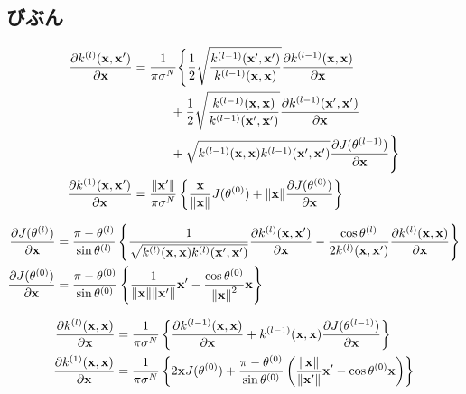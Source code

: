 \documentclass[11pt,a4j]{article}
\begin{document}
    \subsection{びぶん}
      \begin{align}
        \frac{\partial k^{(l)}({\bf x}, {\bf x}')}{\partial {\bf x}} 
        &= \frac{1}{\pi \sigma^N} \Biggl\{ \frac{1}{2} \sqrt{\frac{k^{(l-1)}({\bf x}', {\bf x}')}{k^{(l-1)}({\bf x}, {\bf x})}} \frac{\partial k^{(l-1)}({\bf x}, {\bf x}) }{\partial {\bf x}} \\
        &\hspace{3em}                   + \frac{1}{2} \sqrt{ \frac{k^{(l-1)}({\bf x}, {\bf x})}{k^{(l-1)}({\bf x}', {\bf x}')} } \frac{\partial k^{(l-1)}({\bf x}', {\bf x}') }{\partial {\bf x}} \\
        &\hspace{3em}                   + \sqrt{k^{(l-1)}({\bf x}, {\bf x}) k^{(l-1)}({\bf x}', {\bf x}')} \frac{\partial J(\theta^{(l-1)})}{\partial {\bf x}} \Biggr\} \\
        \frac{\partial k^{(1)}({\bf x}, {\bf x}')}{\partial {\bf x}} 
        &= \frac{\| {\bf x}' \|}{\pi \sigma^N} \left\{ \frac{\bf x}{\| {\bf x} \|} J(\theta^{(0)}) + \|{\bf x}\| \frac{\partial J(\theta^{(0)})}{\partial {\bf x}} \right\} \\
      \end{align}

      \begin{align}
        \frac{\partial J(\theta^{(l)})}{\partial {\bf x}} &= \frac{ \pi - \theta^{(l)}}{ \sin \theta^{(l)}} \left\{ \frac{1}{\sqrt{k^{(l)}({\bf x}, {\bf x}) k^{(l)}({\bf x}', {\bf x}') }} \frac{\partial k^{(l)}({\bf x}, {\bf x}')}{\partial {\bf x}} - \frac{\cos \theta^{(l)}}{2 k^{(l)}({\bf x}, {\bf x}')} \frac{\partial k^{(l)}({\bf x}, {\bf x})}{\partial {\bf x}} \right\} \\
        \frac{\partial J(\theta^{(0)})}{\partial {\bf x}} &= \frac{ \pi - \theta^{(0)}}{ \sin \theta^{(0)}} \left\{ \frac{1}{ \|{\bf x}\| \|{\bf x}'\| } {\bf x}' - \frac{ \cos \theta^{(0)}}{{\|{\bf x}\|}^2} {\bf x} \right\}
      \end{align}

      \begin{align}
        \frac{\partial k^{(l)}({\bf x}, {\bf x})}{\partial {\bf x}} 
        &= \frac{1}{\pi \sigma^N} \left\{ \frac{\partial k^{(l-1)}({\bf x}, {\bf x})}{\partial {\bf x}} + k^{(l-1)}({\bf x}, {\bf x}) \frac{\partial J(\theta^{(l-1)})}{\partial {\bf x}} \right\} \\
        \frac{\partial k^{(1)}({\bf x}, {\bf x})}{\partial {\bf x}} 
        &= \frac{1}{\pi \sigma^N} \left\{ 2 {\bf x} J(\theta^{(0)}) + \frac{\pi - \theta^{(0)}}{\sin \theta^{(0)}} \left( \frac{\|{\bf x}\|}{\|{\bf x}'\|}{\bf x}' - \cos \theta^{(0)} {\bf x} \right) \right\}
      \end{align}
\end{document}
